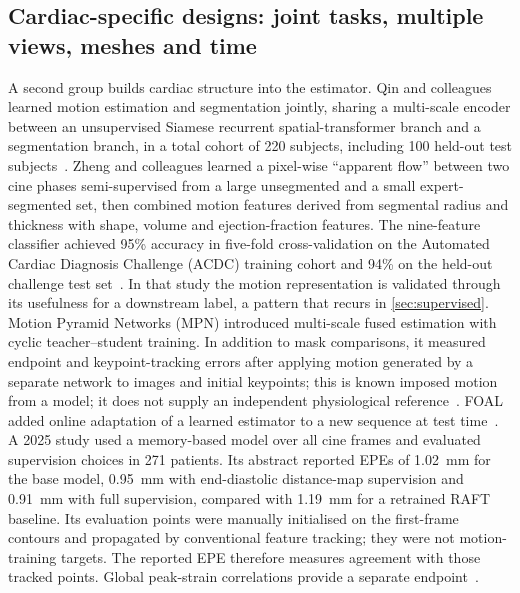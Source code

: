 \subsection{Cardiac-specific designs: joint tasks, multiple views, meshes and time}\label{sec:cardiacspecific}

A second group builds cardiac structure into the estimator. Qin and colleagues learned motion estimation and segmentation jointly, sharing a multi-scale encoder between an unsupervised Siamese recurrent spatial-transformer branch and a segmentation branch, in a total cohort of 220 subjects, including 100 held-out test subjects~\cite{qin2018joint}. Zheng and colleagues learned a pixel-wise ``apparent flow'' between two cine phases semi-supervised from a large unsegmented and a small expert-segmented set, then combined motion features derived from segmental radius and thickness with shape, volume and ejection-fraction features. The nine-feature classifier achieved 95\% accuracy in five-fold cross-validation on the Automated Cardiac Diagnosis Challenge (ACDC) training cohort and 94\% on the held-out challenge test set~\cite{zheng2019apparent}. In that study the motion representation is validated through its usefulness for a downstream label, a pattern that recurs in \cref{sec:supervised}. Motion Pyramid Networks (MPN) introduced multi-scale fused estimation with cyclic teacher--student training. In addition to mask comparisons, it measured endpoint and keypoint-tracking errors after applying motion generated by a separate network to images and initial keypoints; this is known imposed motion from a model; it does not supply an independent physiological reference~\cite{yu2020mpn}. FOAL added online adaptation of a learned estimator to a new sequence at test time~\cite{yu2020foal}. A 2025 study used a memory-based model over all cine frames and evaluated supervision choices in 271 patients. Its abstract reported EPEs of 1.02~mm for the base model, 0.95~mm with end-diastolic distance-map supervision and 0.91~mm with full supervision, compared with 1.19~mm for a retrained RAFT baseline. Its evaluation points were manually initialised on the first-frame contours and propagated by conventional feature tracking; they were not motion-training targets. The reported EPE therefore measures agreement with those tracked points. Global peak-strain correlations provide a separate endpoint~\cite{portal2025semisup}.

